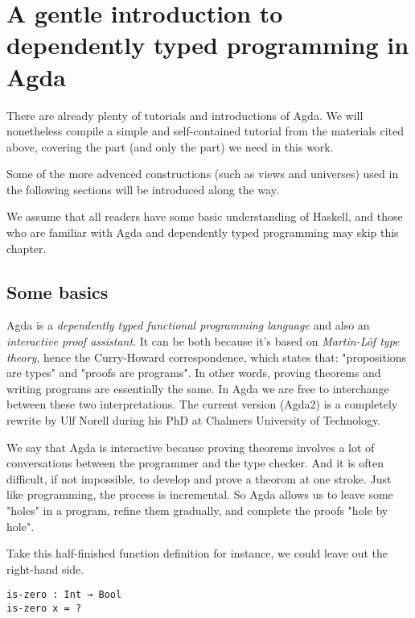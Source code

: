 \documentclass[../thesis.tex]{subfiles}
\begin{document}
\chapter{A gentle introduction to dependently typed programming in Agda}\label{agda}

There are already plenty of tutorials and introductions of Agda\cite{norell2009dependently}\cite{FLOLAC16DTP}\cite{brutal}.
We will nonetheless compile a simple and self-contained tutorial from the
materials cited above, covering the part (and only the part) we need in this work.

Some of the more advenced constructions (such as views and universes) used in
the following sections will be introduced along the way.

We assume that all readers have some basic understanding of Haskell, and those
who are familiar with Agda and dependently typed programming may skip this chapter.

\section{Some basics}

Agda is a \textit{dependently typed functional programming language} and also an
\textit{interactive proof assistant}. It can be both because it's based on
\textit{Martin-Löf type theory}\cite{martin1984intuitionistic}, hence the Curry-Howard
correspondence\cite{sorensen2006lectures}, which states that: "propositions are types"
and "proofs are programs". In other words, proving theorems and writing programs
are essentially the same. In Agda we are free to interchange between these two
interpretations. The current version (Agda2) is a completely rewrite by Ulf Norell
during his PhD at Chalmers University of Technology.

We say that Agda is interactive because proving
theorems involves a lot of conversations between the programmer and the type checker.
And it is often difficult, if not impossible, to develop and prove a theorom at one stroke.
Just like programming, the process is incremental.
So Agda allows us to leave some "holes" in a program, refine them gradually, and
complete the proofs "hole by hole".

Take this half-finished function definition for instance, we could leave out the
right-hand side.

\begin{lstlisting}
is-zero : Int → Bool
is-zero x = ?
\end{lstlisting}
\end{document}
